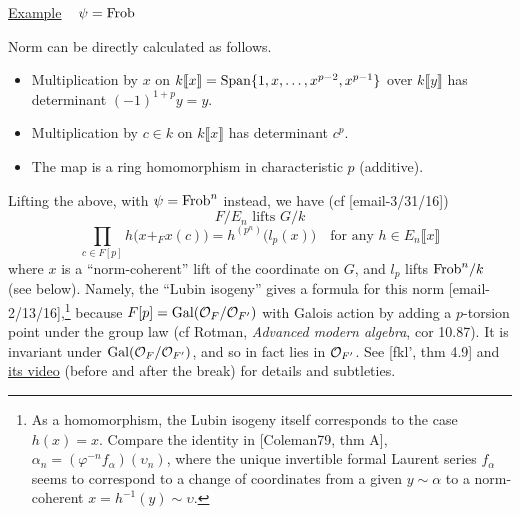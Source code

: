 \documentclass{rs}
\theoremstyle{definition}
\theoremstyle{remark}
\newcommand{\CO}{{\cal O}}
\newcommand{\Gal}{{\rm Gal}}
\newcommand{\Frob}{{\rm Frob}}
\newcommand{\Span}{{\rm Span}}
\newcommand{\A}{\alpha}
\newcommand{\lb}{\llbracket}
\newcommand{\rb}{\rrbracket}
\renewcommand{\=}{\approx}
\renewcommand{\-}{\sim}
\numberwithin{equation}{section}
\numberwithin{thm}{section}
\begin{document}
\underline{Example} ~ $\psi = \Frob$ 
\begin{center}
 \hskip -1.1in
\end{center}
Norm can be directly calculated as follows.  
\begin{itemize}
 \item Multiplication by $x$ on $k\lb x\rb = \Span\{1,x,\ldots,x^{p-2},x^{p-1}\}$ over $k\lb y\rb$ 
 has determinant $(-1)^{1+p} y = y$.  

 \item Multiplication by $c \in k$ on $k\lb x\rb$ has determinant $c^p$.  

 \item The map is a ring homomorphism in characteristic $p$ (additive).  
\end{itemize}
Lifting the above, with $\psi = \Frob^n$ instead, we have (cf [email-3/31/16]) 
\[
 F/E_n \text{~lifts~} G/k 
\]
\begin{equation}
 \label{nm}
 \prod_{c \in F[p]} h\big(x +_F x(c)\big) = h^{(p^n)}\big(l_p(x)\big) \quad \text{for any $h \in E_n\lb x\rb$} 
\end{equation}
where $x$ is a ``norm-coherent'' lift of the coordinate on $G$, and $l_p$ lifts $\Frob^n/k$ (see below).  
Namely, the ``Lubin isogeny'' gives a formula for this norm [email-2/13/16],\footnote{As a homomorphism, 
the Lubin isogeny itself corresponds to the case $h(x) = x$.  
Compare the identity in [Coleman79, thm A], $\A_n = (\varphi^{-n} f_\A)(\upsilon_n)$, 
where the unique invertible formal Laurent series $f_\A$ 
seems to correspond to a change of coordinates from a given $y \sim \A$ to a norm-coherent $x = h^{-1}(y) \sim \upsilon$.  } 
because $F[p] = \Gal(\CO_F/\CO_{F'})$ 
with Galois action by adding a $p$-torsion point under the group law 
(cf Rotman, {\em Advanced modern algebra}, cor 10.87).  
It is invariant under $\Gal(\CO_F/\CO_{F'})$, and so in fact lies in $\CO_{F'}$.  
See [fkl', thm 4.9] and \href{https://youtu.be/r_7SsIoU9No?list=PLul8LCT3AJqQbjdfFSURcgoaik1EPJjc_}{its video} 
(before and after the break) for details and subtleties.  
\end{document}
